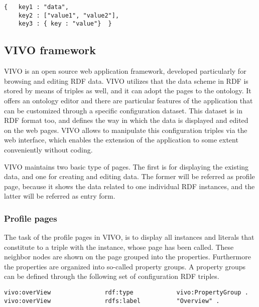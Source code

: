\begin{lstlisting}[captionpos=b, caption=JSON object example, label=jsListing, belowskip=1em, aboveskip=2em,
basicstyle=\footnotesize,frame=single]
{	key1 : "data",
	key2 : ["value1", "value2"],
	key3 : { key : "value"}  }
\end{lstlisting}


\subsection{VIVO framework} \label{vivo}


VIVO is an open source web application framework, developed particularly for browsing and editing RDF data. VIVO utilizes that the data scheme in RDF is stored by means of triples as well, and it can adopt the pages to the ontology. It offers an ontology editor and there are particular features of the application that can be customized through a specific configuration dataset. This dataset is in RDF format too, and defines the way in which the data is displayed and edited on the web pages. VIVO allows to manipulate this configuration triples via the web interface, which enables the extension of the application to some extent conveniently without coding.

VIVO maintains two basic type of pages. The first is for displaying the existing data, and one for creating and editing data. The former will be referred as profile page, because it shows the data related to one individual RDF instances, and the latter will be referred as entry form. 


\subsubsection{Profile pages} \label{vivoPp}

The task of the profile pages in VIVO, is to display all instances and literals that constitute to a triple with the instance, whose page has been called. These neighbor nodes are shown on the page grouped into the properties. Furthermore the properties are organized into so-called property groups. A property groups can be defined through the following set of configuration RDF triples. 

\begin{lstlisting}[captionpos=b, caption=Property group definition, label=jsListing, belowskip=1em, aboveskip=2em,
basicstyle=\footnotesize,frame=single]
vivo:overView				rdf:type			vivo:PropertyGroup .
vivo:overView				rdfs:label			"Overview" .
\end{lstlisting}


